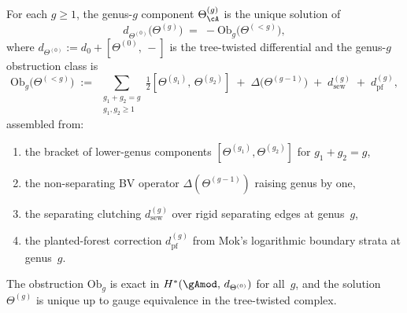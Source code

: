 \begin{theorem}
\label{thm:inductive-genus-determination}
For each $g \geq 1$, the genus-$g$ component $\Theta_\cA^{(g)}$
is the unique solution of
\begin{equation}\label{eq:genus-g-mc}
d_{\Theta^{(0)}}\bigl(\Theta^{(g)}\bigr)
\;=\;
-\mathrm{Ob}_g\bigl(\Theta^{(<g)}\bigr),
\end{equation}
where $d_{\Theta^{(0)}} := d_0 + [\Theta^{(0)},\, -]$ is the
tree-twisted differential and the genus-$g$ obstruction class is
\begin{equation}\label{eq:genus-obstruction}
\mathrm{Ob}_g\bigl(\Theta^{(<g)}\bigr)
\;:=\;
\sum_{\substack{g_1 + g_2 = g\\g_1,g_2 \geq 1}}
\tfrac{1}{2}[\Theta^{(g_1)},\, \Theta^{(g_2)}]
\;+\;
\Delta\bigl(\Theta^{(g-1)}\bigr)
\;+\;
d_{\mathrm{sew}}^{(g)}
\;+\;
d_{\mathrm{pf}}^{(g)},
\end{equation}
assembled from:
\begin{enumerate}[label=\textup{(\roman*)}]
\item the bracket of lower-genus components
  $[\Theta^{(g_1)},\Theta^{(g_2)}]$ for $g_1 + g_2 = g$,
\item the non-separating BV operator
  $\Delta(\Theta^{(g-1)})$ raising genus by one,
\item the separating clutching $d_{\mathrm{sew}}^{(g)}$
  over rigid separating edges at genus~$g$,
\item the planted-forest correction $d_{\mathrm{pf}}^{(g)}$
  from Mok's logarithmic boundary strata at genus~$g$.
\end{enumerate}
The obstruction $\mathrm{Ob}_g$ is exact in
$H^*(\gAmod,\, d_{\Theta^{(0)}})$ for all~$g$, and
the solution $\Theta^{(g)}$ is unique up to gauge equivalence
in the tree-twisted complex.
\end{theorem}

